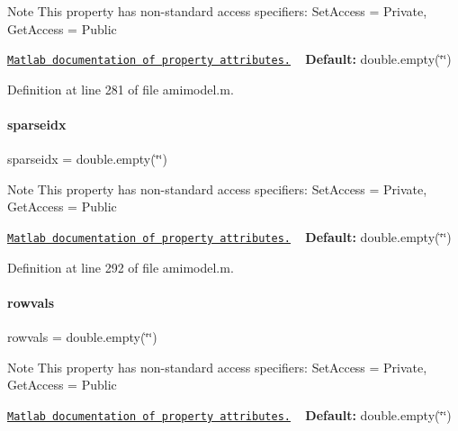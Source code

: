 \begin{DoxyNote}{Note}
This property has non-\/standard access specifiers\+: {\ttfamily Set\+Access = Private, Get\+Access = Public} 

\href{http://www.mathworks.com/help/matlab/matlab_oop/property-attributes.html}{\tt Matlab documentation of property attributes.} ~\newline
{\bfseries Default\+:} double.\+empty(\char`\"{}\char`\"{}) 
\end{DoxyNote}


Definition at line 281 of file amimodel.\+m.

\mbox{\label{classamimodel_a6ffb112eda9ff756e17104210981b30b}} 
\paragraph{\texorpdfstring{sparseidx}{sparseidx}}
{\footnotesize\ttfamily sparseidx = double.\+empty(\char`\"{}\char`\"{})}

\begin{DoxyNote}{Note}
This property has non-\/standard access specifiers\+: {\ttfamily Set\+Access = Private, Get\+Access = Public} 

\href{http://www.mathworks.com/help/matlab/matlab_oop/property-attributes.html}{\tt Matlab documentation of property attributes.} ~\newline
{\bfseries Default\+:} double.\+empty(\char`\"{}\char`\"{}) 
\end{DoxyNote}


Definition at line 292 of file amimodel.\+m.

\mbox{\label{classamimodel_aa0abea3560da3f409a28567f42d52872}} 
\paragraph{\texorpdfstring{rowvals}{rowvals}}
{\footnotesize\ttfamily rowvals = double.\+empty(\char`\"{}\char`\"{})}

\begin{DoxyNote}{Note}
This property has non-\/standard access specifiers\+: {\ttfamily Set\+Access = Private, Get\+Access = Public} 

\href{http://www.mathworks.com/help/matlab/matlab_oop/property-attributes.html}{\tt Matlab documentation of property attributes.} ~\newline
{\bfseries Default\+:} double.\+empty(\char`\"{}\char`\"{}) 
\end{DoxyNote}


